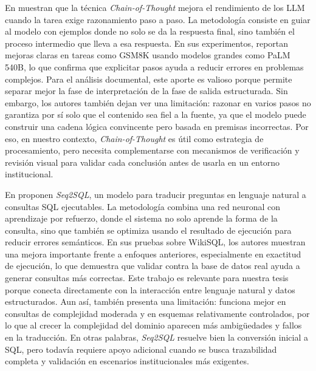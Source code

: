 En \cite{wei2022} muestran que la técnica \textit{Chain-of-Thought} mejora el rendimiento de los \acs{LLM} cuando la tarea exige razonamiento paso a paso. La metodología consiste en guiar al modelo con ejemplos donde no solo se da la respuesta final, sino también el proceso intermedio que lleva a esa respuesta. En sus experimentos, reportan mejoras claras en tareas como GSM8K usando modelos grandes como PaLM 540B, lo que confirma que explicitar pasos ayuda a reducir errores en problemas complejos. Para el análisis documental, este aporte es valioso porque permite separar mejor la fase de interpretación de la fase de salida estructurada. Sin embargo, los autores también dejan ver una limitación: razonar en varios pasos no garantiza por sí solo que el contenido sea fiel a la fuente, ya que el modelo puede construir una cadena lógica convincente pero basada en premisas incorrectas. Por eso, en nuestro contexto, \textit{Chain-of-Thought} es útil como estrategia de procesamiento, pero necesita complementarse con mecanismos de verificación y revisión visual para validar cada conclusión antes de usarla en un entorno institucional.

En \cite{zhong2017seq2sql} proponen \textit{Seq2SQL}, un modelo para traducir preguntas en lenguaje natural a consultas SQL ejecutables. La metodología combina una red neuronal con aprendizaje por refuerzo, donde el sistema no solo aprende la forma de la consulta, sino que también se optimiza usando el resultado de ejecución para reducir errores semánticos. En sus pruebas sobre WikiSQL, los autores muestran una mejora importante frente a enfoques anteriores, especialmente en exactitud de ejecución, lo que demuestra que validar contra la base de datos real ayuda a generar consultas más correctas. Este trabajo es relevante para nuestra tesis porque conecta directamente con la interacción entre lenguaje natural y datos estructurados. Aun así, también presenta una limitación: funciona mejor en consultas de complejidad moderada y en esquemas relativamente controlados, por lo que al crecer la complejidad del dominio aparecen más ambigüedades y fallos en la traducción. En otras palabras, \textit{Seq2SQL} resuelve bien la conversión inicial a SQL, pero todavía requiere apoyo adicional cuando se busca trazabilidad completa y validación en escenarios institucionales más exigentes.

